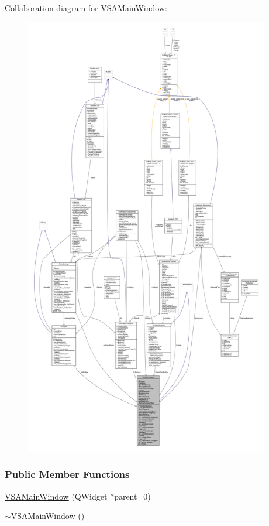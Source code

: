 Collaboration diagram for V\+S\+A\+Main\+Window\+:
\nopagebreak
\begin{figure}[H]
\begin{center}
\leavevmode
\includegraphics[height=550pt]{class_v_s_a_main_window__coll__graph}
\end{center}
\end{figure}
\subsubsection*{Public Member Functions}
\begin{DoxyCompactItemize}
\item 
\hyperlink{class_v_s_a_main_window_a7fa18757c1fce5c8f41f25277f9e1a70}{V\+S\+A\+Main\+Window} (Q\+Widget $\ast$parent=0)
\item 
\hyperlink{class_v_s_a_main_window_ae796e5df1630b2c8ce6d92e84984c071}{$\sim$\+V\+S\+A\+Main\+Window} ()
\end{DoxyCompactItemize}
